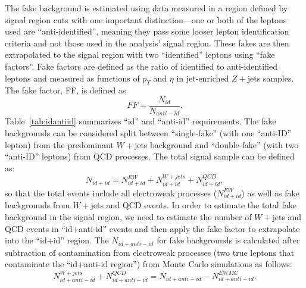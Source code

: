 The fake background is estimated using data measured in a region defined by signal region cuts with one important distinction---one or both of the leptons used are ``anti-identified'', meaning they pass some looser lepton identification criteria and not those used in the analysis' signal region. These fakes are then extrapolated to the signal region with two ``identified'' leptons using ``fake factors''. Fake factors are defined as the ratio of identified to anti-identified leptons and measured as functions of $p_T$ and $\eta$ in jet-enriched $Z+$jets samples. The fake factor, FF, is defined as
\begin{equation}
FF = \frac{N_{id}}{N_{anti-id}}.
\end{equation}
Table~\ref{tab:idantiid} summarizes ``id'' and ``anti-id'' requirements. The fake backgrounds can be considered split between ``single-fake'' (with one ``anti-ID'' lepton) from the predominant $W+$jets background and ``double-fake'' (with two ``anti-ID'' leptons) from QCD processes. The total signal sample can be defined as: 
\begin{equation}
N_{id+id} = N^{EW}_{id+id}+N^{W+jets}_{id+id}+N^{QCD}_{id+id},
\end{equation} 
so that the total events include all electroweak processes ($N^{EW}_{id+id}$) as well as fake backgrounds from $W+$jets and QCD events. In order to estimate the total fake background in the signal region, we need to estimate the number of $W+$jets and QCD events in ``id+anti-id'' events and then apply the fake factor to extrapolate into the ``id+id'' region. The $N_{id+anti-id}$ for fake backgrounds is calculated after subtraction of contamination from electroweak processes (two true leptons that contaminate the ``id+anti-id region'') from Monte Carlo simulations as follows:
\begin{equation}
N^{W+jets}_{id+anti-id}+N^{QCD}_{id+anti-id}=N_{id+anti-id}-N^{EW MC}_{id+anti-id}.
\end{equation}
